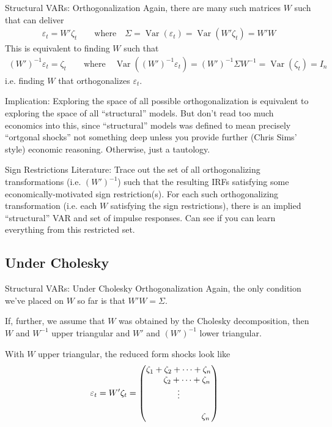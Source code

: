 \documentclass[aspectratio=169, handout]{beamer}
\newcommand{\Var}{\operatorname{Var}}
\begin{document}
{\scriptsize
\begin{frame}{Structural VARs: Orthogonalization}
Again, there are many such matrices $W$ such that can deliver
\begin{align*}
  \varepsilon_t = W'\zeta_t
  \qquad\text{where}\quad
  \Sigma = \Var(\varepsilon_t) = \Var(W'\zeta_t) = W'W
\end{align*}
This is equivalent to finding $W$ such that
\begin{align*}
  (W')^{-1}\varepsilon_t = \zeta_t
  \qquad\text{where}\quad
  \Var((W')^{-1}\varepsilon_t)
  =
  (W')^{-1} \Sigma W^{-1}
  =
  \Var(\zeta_t)
  =
  I_n
\end{align*}
i.e. finding $W$ that \alert{orthogonalizes} $\varepsilon_t$.
\pause

\alert{Implication}: Exploring the space of all possible
orthogonalization is equivalent to exploring the space of all
``structural'' models.
But don't read too much economics into this,
since ``structural'' models was defined to mean precisely ``ortgonal
shocks'' not something deep unless you provide further (Chris Sims'
style) economic reasoning.
Otherwise, just a tautology.

\pause
\alert{Sign Restrictions Literature}:
Trace out the set of all orthogonalizing transformations (i.e.
$(W')^{-1}$) such that the resulting IRFs satisfying some
economically-motivated sign restriction(s).
For each such orthogonalizing transformation (i.e. each $W$ satisfying
the sign restrictions), there is an implied ``structural'' VAR and set
of impulse responses.
Can see if you can learn everything from this restricted set.
\end{frame}
}


\subsection{Under Cholesky}

{\scriptsize
\begin{frame}{Structural VARs: Under Cholesky Orthogonalization}
Again, the only condition we've placed on $W$ so far is that
$W'W=\Sigma$.

If, further, we assume that $W$ was obtained by the Cholesky
decomposition, then $W$ and $W^{-1}$ upper triangular and
$W'$ and $(W')^{-1}$ lower triangular.

\pause
With $W$ \alert{upper triangular},
the reduced form shocks look like
\begin{align*}
  \varepsilon_t &=
  W'\zeta_t
  =
  \begin{pmatrix}
  \zeta_{1} + \zeta_2 + \cdots + \zeta_n \\
  \hphantom{\zeta_{1} + \; } \zeta_{2} + \cdots + \zeta_n \\
  \vdots \\
  \\
  \hphantom{\zeta_{1} + \zeta_{2} + \cdots + }\zeta_n \\
  \end{pmatrix}
\end{align*}
\end{frame}
}
\end{document}
